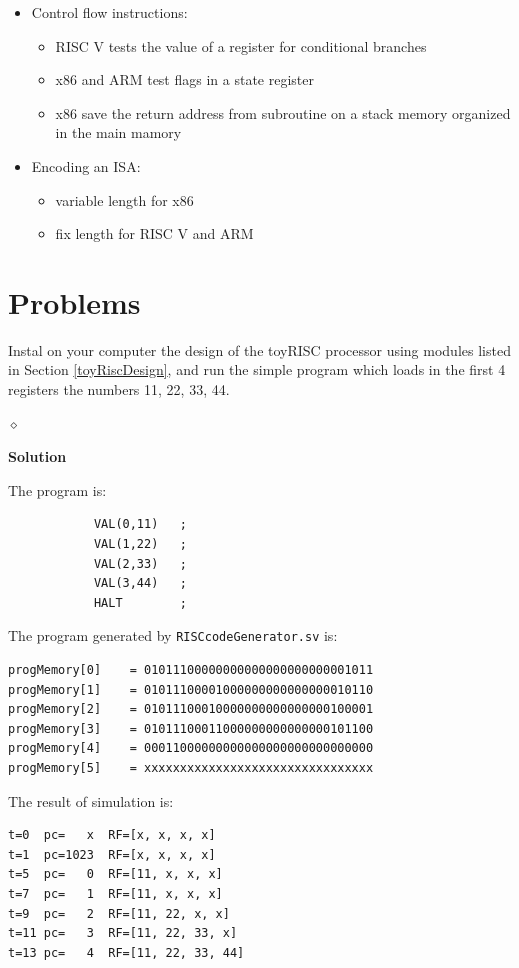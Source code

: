 \begin{itemize}
\begin{itemize}
\begin{itemize}
                    \item floats: add, sub, mult, div, rem
                \end{itemize}
            \item logic: minimally AND and XOR
            \item control: jumps, conditional branches, calls, ret, ...
        \end{itemize}
    \item Control flow instructions:
        \begin{itemize}
            \item RISC V tests the value of a register for conditional branches
            \item x86 and ARM test flags in a state register
            \item x86 save the return address from subroutine on a stack memory organized in the main mamory
        \end{itemize}
    \item Encoding an ISA:
        \begin{itemize}
            \item variable length for x86
            \item fix length for RISC V and ARM
        \end{itemize}
\end{itemize}


\section{Problems}

\begin{problem}
Instal on your computer the design of the toyRISC processor using modules listed in Section \ref{toyRiscDesign}, and run the simple program which loads in the first 4 registers the numbers 11, 22, 33, 44.

$\diamond$
\end{problem}

{\bf Solution}

The program is:
{\small
\begin{verbatim}
            VAL(0,11)   ;
            VAL(1,22)   ;
            VAL(2,33)   ;
            VAL(3,44)   ;
            HALT        ;
\end{verbatim}
}
The program generated by {\tt RISCcodeGenerator.sv} is:
{\small
\begin{verbatim}
progMemory[0]    = 01011100000000000000000000001011
progMemory[1]    = 01011100001000000000000000010110
progMemory[2]    = 01011100010000000000000000100001
progMemory[3]    = 01011100011000000000000000101100
progMemory[4]    = 00011000000000000000000000000000
progMemory[5]    = xxxxxxxxxxxxxxxxxxxxxxxxxxxxxxxx
\end{verbatim}
}
The result of simulation is:
{\small
\begin{verbatim}
t=0  pc=   x  RF=[x, x, x, x]
t=1  pc=1023  RF=[x, x, x, x]
t=5  pc=   0  RF=[11, x, x, x]
t=7  pc=   1  RF=[11, x, x, x]
t=9  pc=   2  RF=[11, 22, x, x]
t=11 pc=   3  RF=[11, 22, 33, x]
t=13 pc=   4  RF=[11, 22, 33, 44]
\end{verbatim}
}

